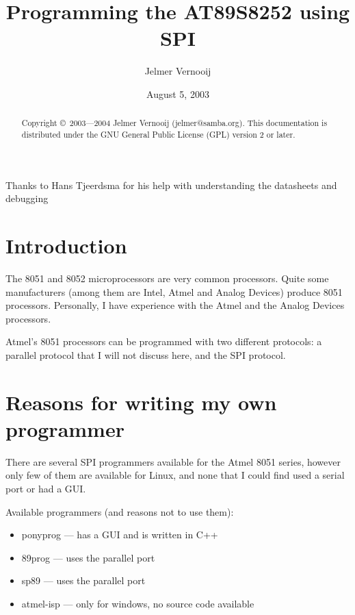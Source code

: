 \documentclass[a4paper]{article}
\begin{document}
\title{Programming the AT89S8252 using SPI}
\date{August 5, 2003}
\author{Jelmer Vernooij}
\maketitle

\begin{center}
	Thanks to Hans Tjeerdsma for his help with understanding the datasheets and debugging
\end{center}

\begin{abstract}
    Copyright \copyright\ 2003---2004  Jelmer Vernooij (jelmer@samba.org).
	This documentation is distributed under the GNU General Public License (GPL) version 2 or later.
\end{abstract}

\lstset{language=C}

\tableofcontents

\section{Introduction}

The 8051 and 8052 microprocessors are very common processors. Quite some 
manufacturers (among them are Intel, Atmel and Analog Devices) produce 8051
processors. Personally, I have experience with the Atmel and the Analog Devices
processors. 

Atmel's 8051 processors can be programmed with two different protocols: 
a parallel protocol that I will not discuss here, and the SPI protocol. 

\section{Reasons for writing my own programmer}

There are several SPI programmers available for the Atmel 8051 series, however
only few of them are available for Linux, and none that I could find used 
a serial port or had a GUI.

Available programmers (and reasons not to use them):

\begin{itemize}
\item ponyprog --- has a GUI and is written in C++
\item 89prog --- uses the parallel port
\item sp89 --- uses the parallel port
\item atmel-isp --- only for windows, no source code available
\end{itemize}
\end{document}
